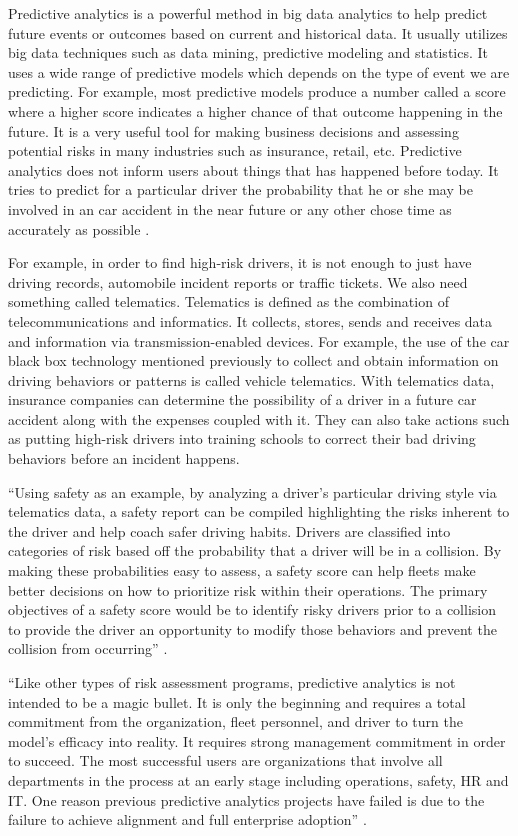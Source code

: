 Predictive analytics is a powerful method in big data analytics to help predict future events or outcomes based on current and historical data. It usually utilizes big data techniques such as data mining, predictive modeling and statistics. It uses a wide range of predictive models which depends on the type of event we are predicting. For example, most predictive models produce a number called a score where a higher score indicates a higher chance of that outcome happening in the future. It is a very useful tool for making business decisions and assessing potential risks in many industries such as insurance, retail, etc. Predictive analytics does not inform users about things that has happened before today. It tries to predict for a particular driver the probability that he or she may be involved in an car accident in the near future or any other chose time as accurately as possible \cite{Suizo2015decisions}.

For example, in order to find high-risk drivers, it is not enough to just have driving records, automobile incident reports or traffic tickets. We also need something called telematics. Telematics is defined as the combination of telecommunications and informatics. It collects, stores, sends and receives data and information via transmission-enabled devices. For example, the use of the car black box technology mentioned previously to collect and obtain information on driving behaviors or patterns is called vehicle telematics. With telematics data, insurance companies can determine the possibility of a driver in a future car accident along with the expenses coupled with it. They can also take actions such as putting high-risk drivers into training schools to correct their bad driving behaviors before an incident happens. 


``Using safety as an example, by analyzing a driver’s particular driving style via telematics data, a safety report can be compiled highlighting the risks inherent to the driver and help coach safer driving habits. Drivers are classified into categories of risk based off the probability that a driver will be in a collision. By making these probabilities easy to assess, a safety score can help fleets make better decisions on how to prioritize risk within their operations. The primary objectives of a safety score would be to identify risky drivers prior to a collision to provide the driver an opportunity to modify those behaviors and prevent the collision from occurring'' \cite{Suizo2015decisions}.

``Like other types of risk assessment programs, predictive analytics is not intended to be a magic bullet. It is only the beginning and requires a total commitment from the organization, fleet personnel, and driver to turn the model’s efficacy into reality. It requires strong management commitment in order to succeed. The most successful users are organizations that involve all departments in the process at an early stage including operations, safety, HR and IT. One reason previous predictive analytics projects have failed is due to the failure to achieve alignment and full enterprise adoption'' \cite{Suizo2015decisions}.


